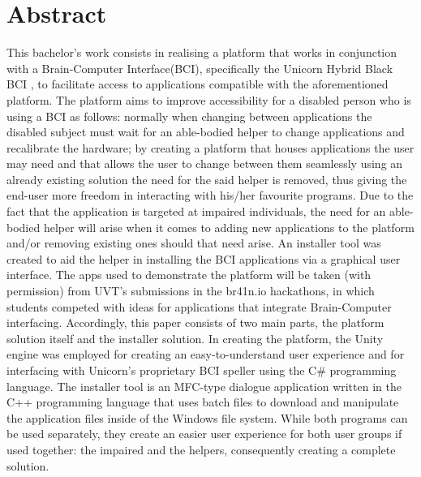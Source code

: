 \chapter*{Abstract}\label{cap:abstract_en}
This bachelor's work consists in realising a platform that works in conjunction with a Brain-Computer Interface(BCI), specifically the Unicorn Hybrid Black BCI \cite{Unicorn_Technology}, to facilitate access to applications compatible with the aforementioned platform. The platform aims to improve accessibility for a disabled person who is using a BCI as follows: normally when changing between applications the disabled subject must wait for an able-bodied helper to change applications and recalibrate the hardware; by creating a platform that houses applications the user may need and that allows the user to change between them seamlessly using an already existing solution \cite{Unicorn_Speller} the need for the said helper is removed, thus giving the end-user more freedom in interacting with his/her favourite programs. 
\vspace{\baselineskip}\newline
Due to the fact that the application is targeted at impaired individuals, the need for an able-bodied helper will arise when it comes to adding new applications to the platform and/or removing existing ones should that need arise. An installer tool was created to aid the helper in installing the BCI applications via a graphical user interface. The apps used to demonstrate the platform will be taken (with permission) from UVT's submissions in the br41n.io hackathons, in which students competed with ideas for applications that integrate Brain-Computer interfacing.
\vspace{\baselineskip}\newline
Accordingly, this paper consists of two main parts, the platform solution itself and the installer solution. In creating the platform, the Unity engine was employed for creating an easy-to-understand user experience and for interfacing with Unicorn's proprietary BCI speller \cite{Unicorn_Speller} using the C\# programming language. The installer tool is an MFC-type dialogue application written in the C++ programming language that uses batch files to download and manipulate the application files inside of the Windows file system. While both programs can be used separately, they create an easier user experience for both user groups if used together: the impaired and the helpers, consequently creating a complete solution.
